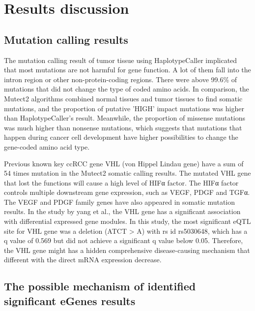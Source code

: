 \section{Results discussion}

\subsection{Mutation calling results}

The mutation calling result of tumor tissue using HaplotypeCaller implicated that most mutations are not harmful for gene function. A lot of them fall into the intron region or other non-protein-coding regions. There were above 99.6\% of mutations that did not change the type of coded amino acids. In comparison, the Mutect2 algorithms combined normal tissues and tumor tissues to find somatic mutations, and the proportion of putative 'HIGH' impact mutations was higher than HaplotypeCaller's result. Meanwhile, the proportion of missense mutations was much higher than nonsense mutations, which suggests that mutations that happen during cancer cell development have higher possibilities to change the gene-coded amino acid type.

Previous known key ccRCC gene VHL (von Hippel Lindau gene) have a sum of 54 times mutation in the Mutect2 somatic calling results. The mutated VHL gene that lost the functions will cause a high level of HIFα factor. The HIFα factor controls multiple downstream gene expression, such as VEGF, PDGF and TGFα\cite{clark_role_2009}. The VEGF and PDGF family genes have also appeared in somatic mutation results. In the study by yang et al.\cite{yang_gene_2017}, the VHL gene has a significant association with differential expressed gene modules. In this study, the most significant eQTL site for VHL gene was a deletion (ATCT > A) with rs id rs5030648, which has a q value of 0.569 but did not achieve a significant q value below 0.05. Therefore, the VHL gene might has a hidden comprehensive disease-causing mechanism that different with the direct mRNA expression decrease. 

\subsection{The possible mechanism of identified significant eGenes results}

